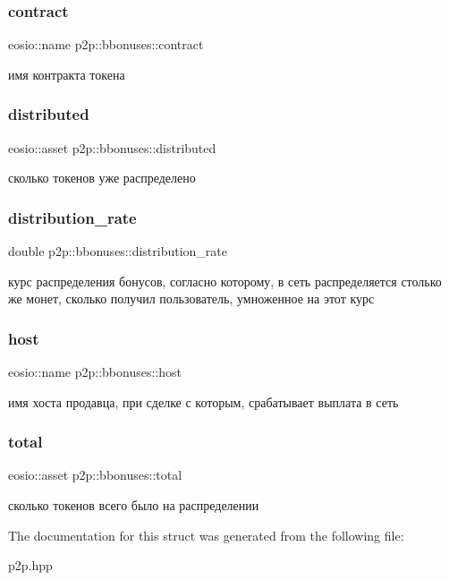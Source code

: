 \subsubsection{\texorpdfstring{contract}{contract}}
{\footnotesize\ttfamily eosio\+::name p2p\+::bbonuses\+::contract}

имя контракта токена \mbox{\label{structp2p_1_1bbonuses_a14d9c11b5763d73a0c7723556b875349}} 
\subsubsection{\texorpdfstring{distributed}{distributed}}
{\footnotesize\ttfamily eosio\+::asset p2p\+::bbonuses\+::distributed}

сколько токенов уже распределено \mbox{\label{structp2p_1_1bbonuses_ac0043fc0d3d405501823046c6e9484ed}} 
\subsubsection{\texorpdfstring{distribution\+\_\+rate}{distribution\_rate}}
{\footnotesize\ttfamily double p2p\+::bbonuses\+::distribution\+\_\+rate}

курс распределения бонусов, согласно которому, в сеть распределяется столько же монет, сколько получил пользователь, умноженное на этот курс \mbox{\label{structp2p_1_1bbonuses_a196ad62fd6230686cb4cbad9f7ee2aeb}} 
\subsubsection{\texorpdfstring{host}{host}}
{\footnotesize\ttfamily eosio\+::name p2p\+::bbonuses\+::host}

имя хоста продавца, при сделке с которым, срабатывает выплата в сеть \mbox{\label{structp2p_1_1bbonuses_a11511c80fc9d57acbf5c61359850ca41}} 
\subsubsection{\texorpdfstring{total}{total}}
{\footnotesize\ttfamily eosio\+::asset p2p\+::bbonuses\+::total}

сколько токенов всего было на распределении 

The documentation for this struct was generated from the following file\+:\begin{DoxyCompactItemize}
\item 
p2p.\+hpp\end{DoxyCompactItemize}
